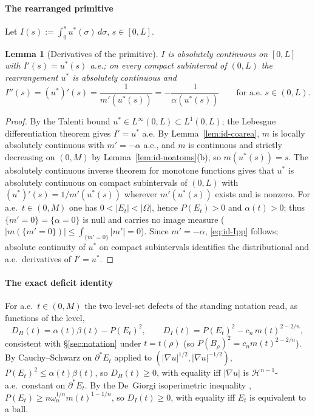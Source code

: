 \documentclass[11pt]{amsart}
\newtheorem{lemma}[theorem]{Lemma}
\theoremstyle{definition}
\newcommand{\Om}{\Omega}
\newcommand{\Hn}{\mathcal H^{n-1}}
\newcommand{\Per}{P}
\begin{document}
\paragraph*{The rearranged primitive}

Let \(I(s):=\int_0^s u^*(\sigma)\,d\sigma\), \(s\in[0,L]\).

\begin{lemma}[Derivatives of the primitive]\label{lem:id-I}
\(I\) is absolutely continuous on \([0,L]\) with \(I'(s)=u^*(s)\) a.e.; on every
compact subinterval of \((0,L)\) the rearrangement \(u^*\) is absolutely
continuous and
\begin{equation}\label{eq:id-Ipp}
   I''(s)=(u^*)'(s)=\frac{1}{m'(u^*(s))}=-\frac{1}{\alpha(u^*(s))}
   \qquad\text{for a.e.\ }s\in(0,L).
\end{equation}
\end{lemma}

\begin{proof}
By the Talenti bound \(u^*\in L^\infty(0,L)\subset L^1(0,L)\); the Lebesgue
differentiation theorem gives \(I'=u^*\) a.e.  By Lemma~\ref{lem:id-coarea},
\(m\) is locally absolutely continuous with \(m'=-\alpha\) a.e., and \(m\) is
continuous and strictly decreasing on \((0,M)\) by
Lemma~\ref{lem:id-noatoms}(b), so \(m(u^*(s))=s\).  The absolutely continuous
inverse theorem for monotone functions \cite[Thm.~0.4, \S1]{BBC1975} gives that
\(u^*\) is absolutely continuous on compact subintervals of \((0,L)\) with
\((u^*)'(s)=1/m'(u^*(s))\) wherever \(m'(u^*(s))\) exists and is nonzero.  For
a.e.\ \(t\in(0,M)\) one has \(0<|E_t|<|\Om|\), hence \(\Per(E_t)>0\) and
\(\alpha(t)>0\); thus \(\{m'=0\}=\{\alpha=0\}\) is null and carries no image
measure (\(|m(\{m'=0\})|\le\int_{\{m'=0\}}|m'|=0\)).  Since \(m'=-\alpha\),
\eqref{eq:id-Ipp} follows; absolute continuity of \(u^*\) on compact
subintervals identifies the distributional and a.e.\ derivatives of
\(I'=u^*\).
\end{proof}

\paragraph*{The exact deficit identity}

For a.e.\ \(t\in(0,M)\) the two level-set defects of the standing notation read,
as functions of the level,
\[
   D_H(t)=\alpha(t)\beta(t)-\Per(E_t)^2,\qquad
   D_I(t)=\Per(E_t)^2-c_n\,m(t)^{2-2/n},
\]
consistent with \S\ref{sec:notation} under \(t=t(\rho)\) (so
\(\Per(B_\rho)^2=c_n m(t)^{2-2/n}\)).  By Cauchy--Schwarz on
\(\partial^*E_t\) applied to \((|\nabla u|^{1/2},|\nabla u|^{-1/2})\),
\(\Per(E_t)^2\le\alpha(t)\beta(t)\), so \(D_H(t)\ge0\), with equality iff
\(|\nabla u|\) is \(\Hn\)-a.e.\ constant on \(\partial^*E_t\).  By the De~Giorgi
isoperimetric inequality \cite{DeGiorgi1958,Maggi2012},
\(\Per(E_t)\ge n\omega_n^{1/n}m(t)^{1-1/n}\), so \(D_I(t)\ge0\), with equality
iff \(E_t\) is equivalent to a ball.
\end{document}
